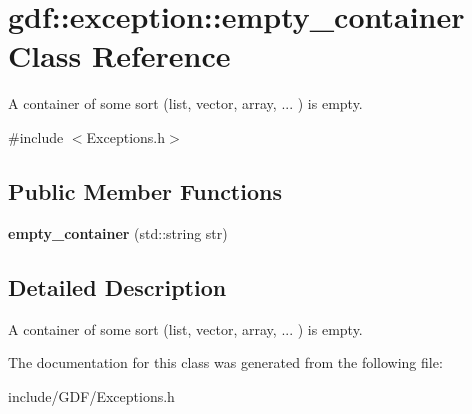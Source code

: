 \hypertarget{classgdf_1_1exception_1_1empty__container}{
\section{gdf::exception::empty\_\-container Class Reference}
\label{classgdf_1_1exception_1_1empty__container}
}


A container of some sort (list, vector, array, ... ) is empty.  




{\ttfamily \#include $<$Exceptions.h$>$}

\subsection*{Public Member Functions}
\begin{DoxyCompactItemize}
\item 
\hypertarget{classgdf_1_1exception_1_1empty__container_a226e3ca46a0a3c658896d956bffb1a0a}{
{\bfseries empty\_\-container} (std::string str)}
\label{classgdf_1_1exception_1_1empty__container_a226e3ca46a0a3c658896d956bffb1a0a}

\end{DoxyCompactItemize}


\subsection{Detailed Description}
A container of some sort (list, vector, array, ... ) is empty. 

The documentation for this class was generated from the following file:\begin{DoxyCompactItemize}
\item 
include/GDF/Exceptions.h\end{DoxyCompactItemize}
